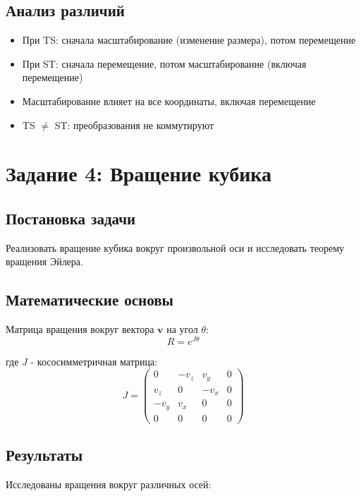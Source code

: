 \subsection*{Анализ различий}
\begin{itemize}
    \item При TS: сначала масштабирование (изменение размера), потом перемещение
    \item При ST: сначала перемещение, потом масштабирование (включая перемещение)
    \item Масштабирование влияет на все координаты, включая перемещение
    \item TS $\neq$ ST: преобразования не коммутируют
\end{itemize}

\section*{Задание 4: Вращение кубика}

\subsection*{Постановка задачи}
Реализовать вращение кубика вокруг произвольной оси и исследовать теорему вращения Эйлера.

\subsection*{Математические основы}
Матрица вращения вокруг вектора $\mathbf{v}$ на угол $\theta$:
\begin{equation}
R = e^{J\theta}
\end{equation}

где $J$ - кососимметричная матрица:
\begin{equation}
J = \begin{pmatrix}
0 & -v_z & v_y & 0 \\
v_z & 0 & -v_x & 0 \\
-v_y & v_x & 0 & 0 \\
0 & 0 & 0 & 0
\end{pmatrix}
\end{equation}

\subsection*{Результаты}
Исследованы вращения вокруг различных осей:

